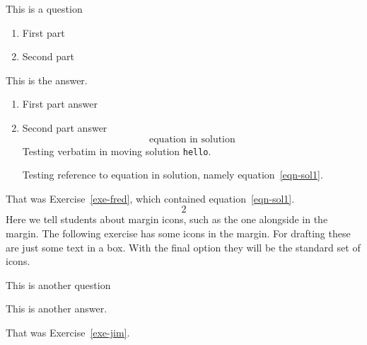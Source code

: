 \documentclass[solutionsatend]{ouunit}
\begin{document}
\begin{exercise}
\label{exe-fred}
This is a question
\begin{enumerate}
\item First part
\item Second part
\end{enumerate}
\begin{solution}
This is the answer.
\begin{enumerate}
\item First part answer
\item Second part answer
\begin{equation}
\text{equation in solution} \label{eqn-sol1}
\end{equation}
Testing verbatim in moving solution \verb"hello".

Testing reference to equation in solution, namely equation~\ref{eqn-sol1}.
\end{enumerate}
\end{solution}
\noendrule
\end{exercise}
\begin{exercise}
\lipsum[133]
\begin{solution}
\lipsum[133]
\end{solution}
\noendrule
\end{exercise}
\begin{exercise}
\lipsum[133]
\begin{solution}
\lipsum[133]
\end{solution}
\end{exercise}
That was Exercise~\ref{exe-fred}, which contained equation~\ref{eqn-sol1}.
\begin{equation}
2
\end{equation}
Here we tell students about margin icons, such as the one alongside in the margin. The following exercise has some icons in the margin. For drafting these are just some text in a box. With the final option they will be the standard set of icons.

\begin{exercise}\label{exe-jim}
This is another question
\begin{solution}
This is another answer.
\end{solution}
\end{exercise}
That was Exercise~\ref{exe-jim}. 
\end{document}
